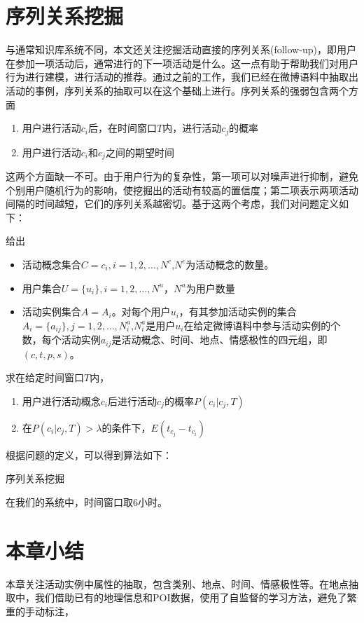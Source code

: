 \section{序列关系挖掘}
与通常知识库系统不同，本文还关注挖掘活动直接的序列关系(follow-up)，即用户在参加一项活动后，通常进行的下一项活动是什么。这一点有助于帮助我们对用户行为进行建模，进行活动的推荐。通过之前的工作，我们已经在微博语料中抽取出活动的事例，序列关系的抽取可以在这个基础上进行。序列关系的强弱包含两个方面
\begin{enumerate}
\item 用户进行活动$c_i$后，在时间窗口$T$内，进行活动$c_j$的概率
\item 用户进行活动$c_i$和$c_j$之间的期望时间
\end{enumerate}
这两个方面缺一不可。由于用户行为的复杂性，第一项可以对噪声进行抑制，避免个别用户随机行为的影响，使挖掘出的活动有较高的置信度；第二项表示两项活动间隔的时间越短，它们的序列关系越密切。基于这两个考虑，我们对问题定义如下：

\begin{problem}[序列关系挖掘]
给出
\begin{itemize}
\item 活动概念集合$C={c_i},i=1,2,\ldots,N^c$,$N^c$为活动概念的数量。
\item 用户集合$U=\{u_i\},i=1,2,\ldots,N^u$，$N^u$为用户数量
\item 活动实例集合$A = {A_i}$。对每个用户$u_i$，有其参加活动实例的集合$A_i = \{a_{ij}\}, j=1,2,\ldots,N_i^a$,$N_i^a$是用户$u_i$在给定微博语料中参与活动实例的个数，每个活动实例$a_{ij}$是活动概念、时间、地点、情感极性的四元组，即$(c,t,p,s)$。
\end{itemize}
求在给定时间窗口$T$内，
\begin{enumerate}
\item 用户进行活动概念$c_i$后进行活动$c_j$的概率$P(c_i|c_j,T)$
\item 在$P(c_i|c_j,T)>\lambda$的条件下，$E(t_{c_j} - t_{c_i})$
\end{enumerate}
\end{problem}

根据问题的定义，可以得到算法如下：

\begin{algorithm}
  \caption{序列关系挖掘}


\end{algorithm}
在我们的系统中，时间窗口取6小时。

\section{本章小结}
本章关注活动实例中属性的抽取，包含类别、地点、时间、情感极性等。在地点抽取中，我们借助已有的地理信息和POI数据，使用了自监督的学习方法，避免了繁重的手动标注，

